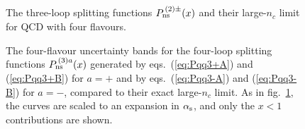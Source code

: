 \documentclass[12pt]{article}
\newcommand{\als}{\alpha_{\rm s}}
\def\nc{{n_c}}
\begin{document}
\begin{figure}[p]
\vspace{-3mm}
\centerline{}
\vspace{-1mm}
\caption{ \label{fig:P2nf4pm} \small
 The three-loop splitting functions $P_{\rm ns}^{\,(2)\pm}(x)$ and their
 large-$\nc$ limit for QCD with four flavours.
 }
\vspace{-1mm}
\end{figure}
%
\begin{figure}[p]
\vspace{-2mm}
\centerline{}
\vspace{-1mm}
\caption{ \label{fig:P3nf4pm} \small
 The four-flavour uncertainty bands for the four-loop splitting functions
 $P_{\rm ns}^{\,(3)a}(x)$ generated by eqs.~(\ref{eq:Pqq3+A}) and 
 (\ref{eq:Pqq3+B}) for $a=+$ and by eqs.~(\ref{eq:Pqq3-A}) and 
 (\ref{eq:Pqq3-B}) for $a=-$, compared to their exact large-$\nc$ limit. 
 As in fig.~\ref{fig:P2nf4pm}, the curves are scaled to an expansion in 
 $\als$, and only the $x<1$ contributions are shown.
 }
\vspace{-1mm}
\end{figure}

\pagebreak
\end{document}

